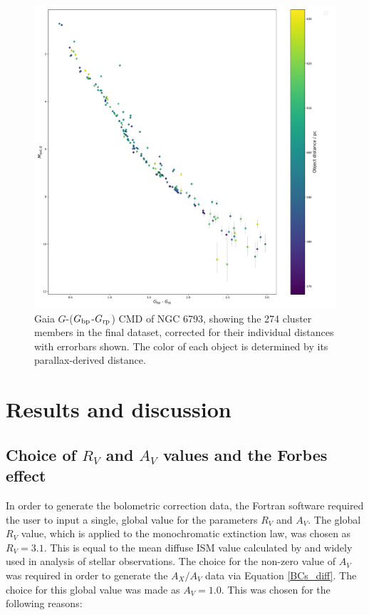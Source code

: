 \documentclass[12pt, a4paper]{report}
\begin{document}
\begin{figure}[h!]
\begin{center}
\includegraphics[width=1.0\textwidth]{../NGC_6793_CMD_observational_errorbars.pdf}
\caption{Gaia $G$-($G_{\textnormal{bp}}$-$G_{\textnormal{rp}}$) CMD of NGC 6793, showing the 274 cluster members in the final dataset, corrected for their individual distances with errorbars shown. The color of each object is determined by its parallax-derived distance.}
\label{NGC_6793_obs_only}
\end{center}
\end{figure}

\chapter{Results and discussion}
\section{Choice of $R_{V}$ and $A_{V}$ values and the Forbes effect} \label{forbes}
In order to generate the bolometric correction data, the Fortran software required the user to input a single, global value for the parameters $R_{V}$ and $A_{V}$. The global $R_{V}$ value, which is applied to the \cite{1989ApJ...345..245C} monochromatic extinction law, was chosen as $R_{V} = 3.1$. This is equal to the mean diffuse ISM value calculated by \cite{1985ApJ...288..618R} and widely used in analysis of stellar observations. The choice for the non-zero value of $A_{V}$ was required in order to generate the $A_{X}/A_{V}$ data via Equation \ref{BCs_diff}. The choice for this global value was made as $A_{V} = 1.0$. This was chosen for the following reasons:
\end{document}
